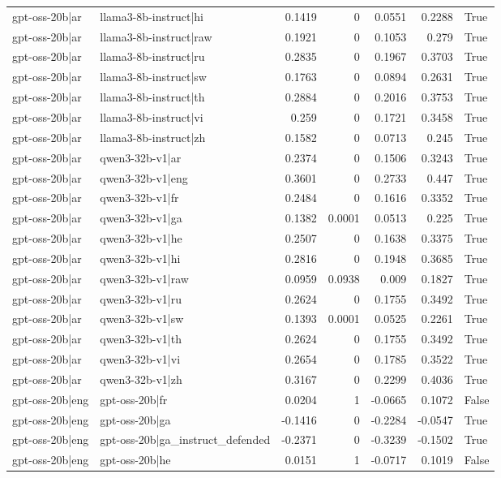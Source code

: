 \begin{table}
\begin{tabular}{l l r r r r l}
gpt-oss-20b|ar & llama3-8b-instruct|hi & 0.1419 & 0 & 0.0551 & 0.2288 & True \\
gpt-oss-20b|ar & llama3-8b-instruct|raw & 0.1921 & 0 & 0.1053 & 0.279 & True \\
gpt-oss-20b|ar & llama3-8b-instruct|ru & 0.2835 & 0 & 0.1967 & 0.3703 & True \\
gpt-oss-20b|ar & llama3-8b-instruct|sw & 0.1763 & 0 & 0.0894 & 0.2631 & True \\
gpt-oss-20b|ar & llama3-8b-instruct|th & 0.2884 & 0 & 0.2016 & 0.3753 & True \\
gpt-oss-20b|ar & llama3-8b-instruct|vi & 0.259 & 0 & 0.1721 & 0.3458 & True \\
gpt-oss-20b|ar & llama3-8b-instruct|zh & 0.1582 & 0 & 0.0713 & 0.245 & True \\
gpt-oss-20b|ar & qwen3-32b-v1|ar & 0.2374 & 0 & 0.1506 & 0.3243 & True \\
gpt-oss-20b|ar & qwen3-32b-v1|eng & 0.3601 & 0 & 0.2733 & 0.447 & True \\
gpt-oss-20b|ar & qwen3-32b-v1|fr & 0.2484 & 0 & 0.1616 & 0.3352 & True \\
gpt-oss-20b|ar & qwen3-32b-v1|ga & 0.1382 & 0.0001 & 0.0513 & 0.225 & True \\
gpt-oss-20b|ar & qwen3-32b-v1|he & 0.2507 & 0 & 0.1638 & 0.3375 & True \\
gpt-oss-20b|ar & qwen3-32b-v1|hi & 0.2816 & 0 & 0.1948 & 0.3685 & True \\
gpt-oss-20b|ar & qwen3-32b-v1|raw & 0.0959 & 0.0938 & 0.009 & 0.1827 & True \\
gpt-oss-20b|ar & qwen3-32b-v1|ru & 0.2624 & 0 & 0.1755 & 0.3492 & True \\
gpt-oss-20b|ar & qwen3-32b-v1|sw & 0.1393 & 0.0001 & 0.0525 & 0.2261 & True \\
gpt-oss-20b|ar & qwen3-32b-v1|th & 0.2624 & 0 & 0.1755 & 0.3492 & True \\
gpt-oss-20b|ar & qwen3-32b-v1|vi & 0.2654 & 0 & 0.1785 & 0.3522 & True \\
gpt-oss-20b|ar & qwen3-32b-v1|zh & 0.3167 & 0 & 0.2299 & 0.4036 & True \\
gpt-oss-20b|eng & gpt-oss-20b|fr & 0.0204 & 1 & -0.0665 & 0.1072 & False \\
gpt-oss-20b|eng & gpt-oss-20b|ga & -0.1416 & 0 & -0.2284 & -0.0547 & True \\
gpt-oss-20b|eng & gpt-oss-20b|ga_instruct_defended & -0.2371 & 0 & -0.3239 & -0.1502 & True \\
gpt-oss-20b|eng & gpt-oss-20b|he & 0.0151 & 1 & -0.0717 & 0.1019 & False \\

\end{tabular}
\end{table}

